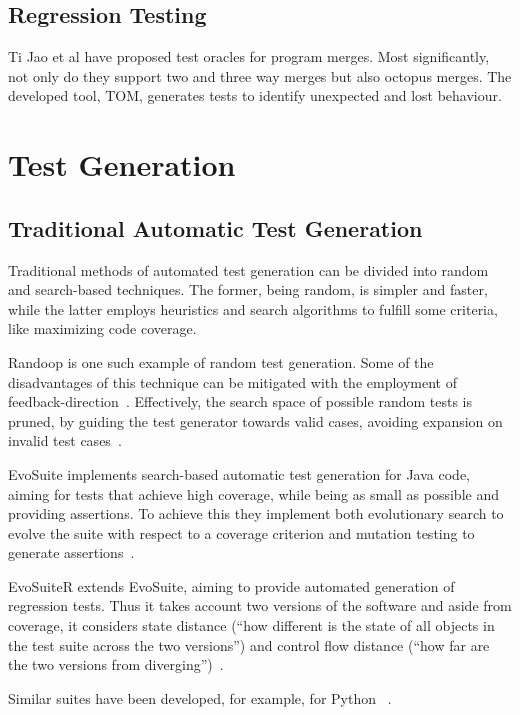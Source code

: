 \subsection{Regression Testing}

Ti Jao et al have proposed test oracles for program merges. Most significantly, not only do they support two and three way merges but also octopus merges. The developed tool, TOM, generates tests to identify unexpected and lost behaviour\citep{kn:ji2022}.

\section{Test Generation}

\subsection{Traditional Automatic Test Generation}

Traditional methods of automated test generation can be divided into random and search-based techniques. The former, being random, is simpler and faster, while the latter employs heuristics and search algorithms to fulfill some criteria, like maximizing code coverage.

Randoop is one such example of random test generation. Some of the disadvantages of this technique can be mitigated with the employment of feedback-direction~\citep{kn:randoop}. Effectively, the search space of possible random tests is pruned, by guiding the test generator towards valid cases, avoiding expansion on invalid test cases~\citep{kn:randoop}.

EvoSuite implements search-based automatic test generation for Java code, aiming for tests that achieve high coverage, while being as small as possible and providing assertions. To achieve this they implement both evolutionary search to evolve the suite with respect to a coverage criterion and mutation testing to generate assertions~\citep{kn:evosuite}.

EvoSuiteR extends EvoSuite, aiming to provide automated generation of regression tests. Thus it takes account two versions of the software and aside from coverage, it considers state distance (``how different is the state of
all objects in the test suite across the two versions'') and control flow distance (``how
far are the two versions from diverging'')~\citep{kn:evosuiter}.


Similar suites have been developed, for example, for Python ~\citep{kn:pynguin}.


